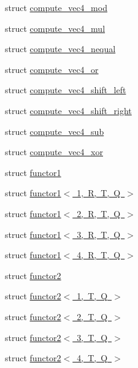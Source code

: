 \begin{DoxyCompactItemize}
struct \mbox{\hyperlink{structglm_1_1detail_1_1compute__vec4__mod}{compute\+\_\+vec4\+\_\+mod}}
\item 
struct \mbox{\hyperlink{structglm_1_1detail_1_1compute__vec4__mul}{compute\+\_\+vec4\+\_\+mul}}
\item 
struct \mbox{\hyperlink{structglm_1_1detail_1_1compute__vec4__nequal}{compute\+\_\+vec4\+\_\+nequal}}
\item 
struct \mbox{\hyperlink{structglm_1_1detail_1_1compute__vec4__or}{compute\+\_\+vec4\+\_\+or}}
\item 
struct \mbox{\hyperlink{structglm_1_1detail_1_1compute__vec4__shift__left}{compute\+\_\+vec4\+\_\+shift\+\_\+left}}
\item 
struct \mbox{\hyperlink{structglm_1_1detail_1_1compute__vec4__shift__right}{compute\+\_\+vec4\+\_\+shift\+\_\+right}}
\item 
struct \mbox{\hyperlink{structglm_1_1detail_1_1compute__vec4__sub}{compute\+\_\+vec4\+\_\+sub}}
\item 
struct \mbox{\hyperlink{structglm_1_1detail_1_1compute__vec4__xor}{compute\+\_\+vec4\+\_\+xor}}
\item 
struct \mbox{\hyperlink{structglm_1_1detail_1_1functor1}{functor1}}
\item 
struct \mbox{\hyperlink{structglm_1_1detail_1_1functor1_3_011_00_01_r_00_01_t_00_01_q_01_4}{functor1$<$ 1, R, T, Q $>$}}
\item 
struct \mbox{\hyperlink{structglm_1_1detail_1_1functor1_3_012_00_01_r_00_01_t_00_01_q_01_4}{functor1$<$ 2, R, T, Q $>$}}
\item 
struct \mbox{\hyperlink{structglm_1_1detail_1_1functor1_3_013_00_01_r_00_01_t_00_01_q_01_4}{functor1$<$ 3, R, T, Q $>$}}
\item 
struct \mbox{\hyperlink{structglm_1_1detail_1_1functor1_3_014_00_01_r_00_01_t_00_01_q_01_4}{functor1$<$ 4, R, T, Q $>$}}
\item 
struct \mbox{\hyperlink{structglm_1_1detail_1_1functor2}{functor2}}
\item 
struct \mbox{\hyperlink{structglm_1_1detail_1_1functor2_3_011_00_01_t_00_01_q_01_4}{functor2$<$ 1, T, Q $>$}}
\item 
struct \mbox{\hyperlink{structglm_1_1detail_1_1functor2_3_012_00_01_t_00_01_q_01_4}{functor2$<$ 2, T, Q $>$}}
\item 
struct \mbox{\hyperlink{structglm_1_1detail_1_1functor2_3_013_00_01_t_00_01_q_01_4}{functor2$<$ 3, T, Q $>$}}
\item 
struct \mbox{\hyperlink{structglm_1_1detail_1_1functor2_3_014_00_01_t_00_01_q_01_4}{functor2$<$ 4, T, Q $>$}}

\end{DoxyCompactItemize}
